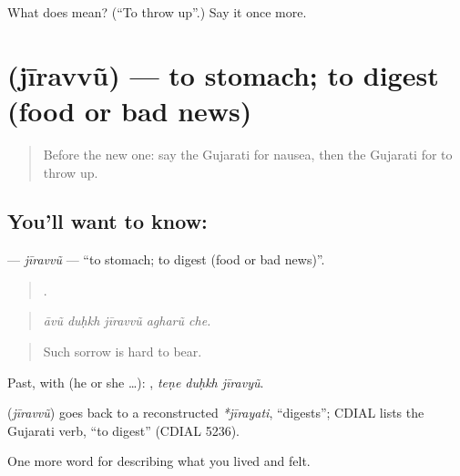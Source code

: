 \begin{tcolorbox}[breakable,colback=teal!4,colframe=teal!35!black,title={Before you move on}]
What does  mean? (\textquotedblleft{}To throw up\textquotedblright{}.) Say it once more.
\end{tcolorbox}
\section[\texorpdfstring{\gu{જીરવવું} (jīravvũ)}{જીરવવું (jīravvũ)}]{ (jīravvũ) — to stomach; to digest (food or bad news)}

\label{lesson:GU-C477-jiravvu}



\begin{quote}
Before the new one: say the Gujarati for nausea, then the Gujarati for to throw up.
\end{quote}

\subsection*{You'll want to know: }
\textbf{} — \emph{jīravvũ} — \textquotedblleft{}to stomach; to digest (food or bad news)\textquotedblright{}.

\begin{quote}
    .
\end{quote}

\begin{quote}
\emph{āvũ duḥkh jīravvũ agharũ che.}
\end{quote}

\begin{quote}
Such sorrow is hard to bear.
\end{quote}

Past, with  (he or she …):   , \emph{teṇe duḥkh jīravyũ}.

\begin{cousinweb}
\textbf{} (\emph{jīravvũ}) goes back to a reconstructed \emph{*jīrayati}, \textquotedblleft{}digests\textquotedblright{}; CDIAL lists the Gujarati verb, \textquotedblleft{}to digest\textquotedblright{} (CDIAL 5236).
\end{cousinweb}

\begin{grammarlens}[title={What you've built}]
One more word for describing what you lived and felt.
\end{grammarlens}

